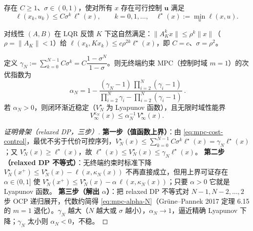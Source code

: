 \begin{definition}[指数代价可控性]
\label{def:mpc-cost-controllability}
存在 $C\ge1$、$\sigma\in(0,1)$，使对所有 $x$ 存在可行控制 $\mathbf u$ 满足
\begin{equation}
  \ell(x_k,u_k)\le C\sigma^k\,\ell^\star(x),\qquad k=0,1,\dots,\quad \ell^\star(x):=\min_u\ell(x,u).
  \label{eq:mpc-cost-control}
\end{equation}
\end{definition}

\noindent{}对线性 $(A,B)$ 在 LQR 反馈 $K$ 下这自然满足：$\|A_K^kx\|\le\rho^k\|x\|$（$\rho=\|A_K\|<1$）给 $\ell(x_k,Kx_k)\le c\rho^{2k}\ell^\star(x)$，即 $C=c$、$\sigma=\rho^2$。

\begin{theorem}
\label{thm:mpc-gruene}
定义 $\gamma_N:=\sum_{k=0}^{N-1}C\sigma^k=C\dfrac{1-\sigma^N}{1-\sigma}$。则无终端约束 MPC（控制时域 $m=1$）的次优指数为
\begin{equation}
  \boxed{\ \alpha_N=1-\frac{(\gamma_N-1)\,\prod_{i=2}^{N}(\gamma_i-1)}{\prod_{i=2}^{N}\gamma_i-\prod_{i=2}^{N}(\gamma_i-1)}\ }.
  \label{eq:mpc-alpha-N}
\end{equation}
若 $\alpha_N>0$，则闭环渐近稳定（$V_N^\star$ 为 Lyapunov 函数），且无限时域性能界
\begin{equation}
  V_\infty^{\kappa_N}(x)\le\alpha_N^{-1}\,V_\infty^{\star}(x).
  \label{eq:mpc-perf-bound}
\end{equation}
\end{theorem}

\begin{proof}[证明骨架（relaxed DP，三步）]
\textbf{第一步（值函数上界）}：由 \cref{eq:mpc-cost-control}，最优不劣于代价可控序列，$V_N^\star(x)\le\sum_{k=0}^{N-1}C\sigma^k\ell^\star(x)=\gamma_N\ell^\star(x)$；又 $V_N^\star(x)\ge\ell^\star(x)$，故 $\ell^\star(x)\le V_N^\star(x)\le\gamma_N\ell^\star(x)$。
\textbf{第二步（relaxed DP 不等式）}：无终端约束时标准下降 $V_N^\star(x^+)\le V_N^\star(x)-\ell(x,\kappa_N(x))$ 不再直接成立，但用上界可证存在 $\alpha\in(0,1]$ 使 $V_N^\star(x^+)\le V_N^\star(x)-\alpha\,\ell(x,\kappa_N(x))$；只要 $\alpha>0$ 它就是 Lyapunov 函数。
\textbf{第三步（解出 $\alpha$）}：把 relaxed DP 不等式对 $N-1,N-2,\dots,2$ 步 OCP 递归展开，代数约简得 \cref{eq:mpc-alpha-N}（Grüne--Pannek 2017 定理 6.15 的 $m=1$ 退化）。$\gamma_N$ 越大（$N$ 越大或 $\sigma$ 越小），$\alpha_N\to1$，逼近精确 Lyapunov 下降；$\gamma_N$ 太小则 $\alpha_N<0$，不稳。
\end{proof}

